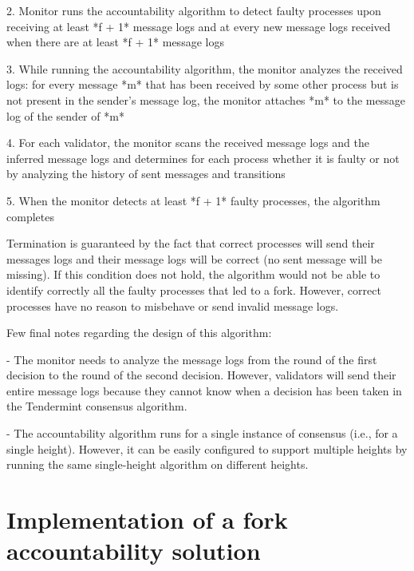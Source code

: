 \documentclass[a4paper,11pt,oneside]{report}
\begin{document}
\begin{markdown}
2. Monitor runs the accountability algorithm to detect faulty processes upon receiving at least *f + 1* message logs and at every new message logs received when there are at least *f + 1* message logs 

3. While running the accountability algorithm, the monitor analyzes the received logs: for every message *m* that has been received by some other process but is not present in the sender's message log, the monitor attaches *m* to the message log of the sender of *m*

4. For each validator, the monitor scans the received message logs and the inferred message logs and determines for each process whether it is faulty or not by analyzing the history of sent messages and transitions

5. When the monitor detects at least *f + 1* faulty processes, the algorithm completes

Termination is guaranteed by the fact that correct processes will send their messages logs and their message logs will be correct (no sent message will be missing). 
If this condition does not hold, the algorithm would not be able to identify correctly all the faulty processes that led to a fork. However, correct processes have no reason to misbehave or send invalid message logs. 

Few final notes regarding the design of this algorithm:

- The monitor needs to analyze the message logs from the round of the first decision to the round of the second decision. However, validators will send their entire message logs because they cannot know when a decision has been taken in the Tendermint consensus algorithm. 

- The accountability algorithm runs for a single instance of consensus (i.e., for a single height). However, it can be easily configured to support multiple heights by running the same single-height algorithm on different heights. 

\end{markdown}

\chapter{Implementation of a fork accountability solution}
\end{document}
